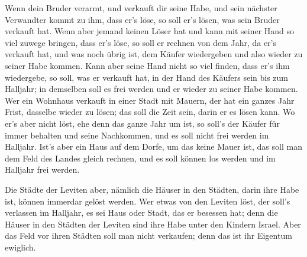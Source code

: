  Wenn dein Bruder verarmt, und verkauft dir seine Habe,
und sein nächster Verwandter kommt zu ihm, dass er's löse, so soll er's
lösen, was sein Bruder verkauft hat.  Wenn aber jemand
keinen Löser hat und kann mit seiner Hand so viel zuwege bringen, dass
er's löse,  so soll er rechnen von dem Jahr, da er's
verkauft hat, und was noch übrig ist, dem Käufer wiedergeben und also
wieder zu seiner Habe kommen.  Kann aber seine Hand nicht
so viel finden, dass er's ihm wiedergebe, so soll, was er verkauft hat,
in der Hand des Käufers sein bis zum Halljahr; in demselben soll es frei
werden und er wieder zu seiner Habe kommen.  Wer ein
Wohnhaus verkauft in einer Stadt mit Mauern, der hat ein ganzes Jahr
Frist, dasselbe wieder zu lösen; das soll die Zeit sein, darin er es
lösen kann.  Wo er's aber nicht löst, ehe denn das ganze
Jahr um ist, so soll's der Käufer für immer behalten und seine
Nachkommen, und es soll nicht frei werden im Halljahr. 
Ist's aber ein Haus auf dem Dorfe, um das keine Mauer ist, das soll man
dem Feld des Landes gleich rechnen, und es soll können los werden und im
Halljahr frei werden.

 Die Städte der Leviten aber, nämlich die Häuser in den
Städten, darin ihre Habe ist, können immerdar gelöst werden.
 Wer etwas von den Leviten löst, der soll's verlassen im
Halljahr, es sei Haus oder Stadt, das er besessen hat; denn die Häuser
in den Städten der Leviten sind ihre Habe unter den Kindern Israel.
 Aber das Feld vor ihren Städten soll man nicht
verkaufen; denn das ist ihr Eigentum ewiglich.

